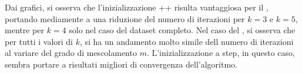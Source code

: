 \documentclass[runningheads]{llncs}
\begin{document}
Dai grafici, si osserva che l'inizializzazione ++ risulta vantaggiosa per il \km, portando mediamente a una riduzione del numero di iterazioni per $k=3$ e $k=5$, mentre per $k=4$ solo nel caso del dataset completo.
Nel caso del \fcm, si osserva che per tutti i valori di $k$, si ha un andamento molto simile dell numero di iterazioni al variare del grado di mescolamento $m$. L'inizializzazione a step, in questo caso, sembra portare a risultati migliori di convergenza dell'algoritmo.

%
%


%

\begin{figure}
  \centering
\end{figure}
\end{document}
